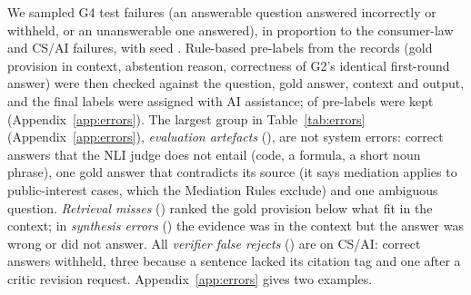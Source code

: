 We sampled  G4 test failures (an answerable question answered incorrectly or withheld, or an unanswerable one answered), in proportion to the  consumer-law and  CS/AI failures, with seed .
Rule-based pre-labels from the records (gold provision in context, abstention reason, correctness of G2's identical first-round answer) were then checked against the question, gold answer, context and output, and the final labels were assigned with AI assistance;  of  pre-labels were kept (Appendix~\ref{app:errors}).
The largest group in Table~\ref{tab:errors} (Appendix~\ref{app:errors}), \emph{evaluation artefacts} (), are not system errors: correct answers that the NLI judge does not entail (code, a formula, a short noun phrase), one gold answer that contradicts its source (it says mediation applies to public-interest cases, which the Mediation Rules exclude) and one ambiguous question.
\emph{Retrieval misses} () ranked the gold provision below what fit in the context; in \emph{synthesis errors} () the evidence was in the context but the answer was wrong or did not answer.
All \emph{verifier false rejects} () are on CS/AI: correct answers withheld, three because a sentence lacked its citation tag and one after a critic revision request.
Appendix~\ref{app:errors} gives two examples.
